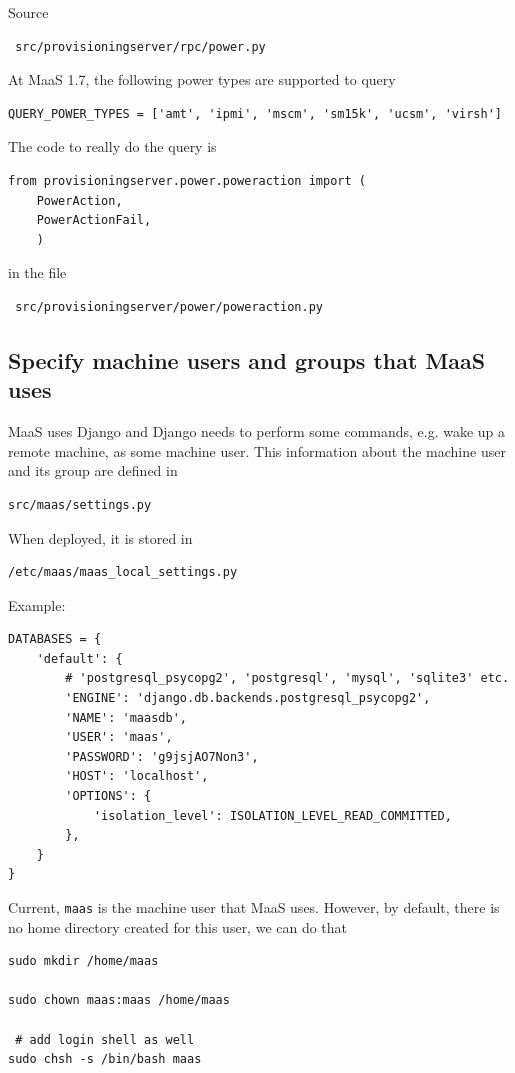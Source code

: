 Source 
\begin{verbatim}
 src/provisioningserver/rpc/power.py
\end{verbatim}
At MaaS 1.7, the following power types are supported to query
\begin{verbatim}
QUERY_POWER_TYPES = ['amt', 'ipmi', 'mscm', 'sm15k', 'ucsm', 'virsh']
\end{verbatim}

The code to really do the query is 
\begin{verbatim}
from provisioningserver.power.poweraction import (
    PowerAction,
    PowerActionFail,
    )
\end{verbatim}
in the file
\begin{verbatim}
 src/provisioningserver/power/poweraction.py
\end{verbatim}

\subsection{Specify machine users and groups that MaaS uses}
\label{sec:specify_machine-user_MaaS-use}

MaaS uses Django and Django needs to perform some commands, e.g. wake up a
remote machine, as some machine user. This information about the machine user
and its group are defined in 
\begin{verbatim}
src/maas/settings.py
\end{verbatim}

When deployed, it is stored in
\begin{verbatim}
/etc/maas/maas_local_settings.py
\end{verbatim}


Example:
\begin{verbatim}
DATABASES = {
    'default': {
        # 'postgresql_psycopg2', 'postgresql', 'mysql', 'sqlite3' etc.
        'ENGINE': 'django.db.backends.postgresql_psycopg2',
        'NAME': 'maasdb',
        'USER': 'maas',
        'PASSWORD': 'g9jsjAO7Non3',
        'HOST': 'localhost',
        'OPTIONS': {
            'isolation_level': ISOLATION_LEVEL_READ_COMMITTED,
        },
    }
}
\end{verbatim}

Current, \verb!maas! is the machine user that MaaS uses. However, by default,
there is no home directory created for this user, we can do that

\begin{verbatim}
sudo mkdir /home/maas

sudo chown maas:maas /home/maas

 # add login shell as well
sudo chsh -s /bin/bash maas
\end{verbatim}





